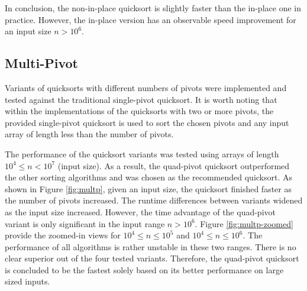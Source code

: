 \documentclass[titlepage, 12pt]{article}
\begin{document}
In conclusion, the non-in-place quicksort is slightly faster than the in-place
one in practice. However, the in-place version has an observable speed
improvement for an input size \( n > 10^6 \).

\subsection{Multi-Pivot}

Variants of quicksorts with different numbers of pivots were implemented and
tested against the traditional single-pivot quicksort. It is worth noting that
within the implementations of the quicksorts with two or more pivots, the
provided single-pivot quicksort is used to sort the chosen pivots and any input
array of length less than the number of pivots.

The performance of the quicksort variants was tested using arrays of length \(
10^4 \leq n < 10^7 \) (input size). As a result, the quad-pivot quicksort
outperformed the other sorting algorithms and was chosen as the recommended
quicksort. As shown in Figure \ref{fig:multp}, given an input size, the
quicksort finished faster as the number of pivots increased. The runtime
differences between variants widened as the input size increased. However, the
time advantage of the quad-pivot variant is only significant in the input range
\( n > 10^6 \). Figure \ref{fig:multp-zoomed} provide the zoomed-in views for \(
10^4 \leq n \leq 10^5 \) and \( 10^4 \leq n \leq 10^6 \). The performance of all
algorithms is rather unstable in these two ranges. There is no clear superior
out of the four tested variants. Therefore, the quad-pivot quicksort is
concluded to be the fastest solely based on its better performance on large
sized inputs.
\end{document}

